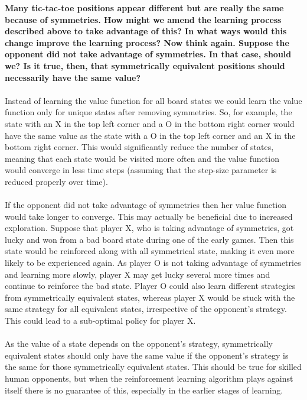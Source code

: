 \documentclass[a4paper,11pt]{article}
\numberwithin{equation}{section}
\theoremstyle{remark}
\begin{document}
\textbf{Many tic-tac-toe positions appear different but are really the same because of symmetries. How might we amend the learning process described above to take advantage of this? In what ways would this change improve the learning process? Now think again. Suppose the opponent did not take advantage of symmetries. In that case, should we? Is it true, then, that symmetrically equivalent positions should necessarily have the same value?}
\\ \\
Instead of learning the value function for all board states we could learn the value function only for unique states after removing symmetries. So, for example, the state with an X in the top left corner and a O in the bottom right corner would have the same value as the state with a O in the top left corner and an X in the bottom right corner. This would significantly reduce the number of states, meaning that each state would be visited more often and the value function would converge in less time steps (assuming that the step-size parameter is reduced properly over time).  
\\ \\
If the opponent did not take advantage of symmetries then her value function would take longer to converge. This may actually be beneficial due to increased exploration. Suppose that player X, who is taking advantage of symmetries, got lucky and won from a bad board state during one of the early games. Then this state would be reinforced along with all symmetrical state, making it even more likely to be experienced again. As player O is not taking advantage of symmetries and learning more slowly, player X may get lucky several more times and continue to reinforce the bad state. Player O could also learn different strategies from symmetrically equivalent states, whereas player X would be stuck with the same strategy for all equivalent states, irrespective of the opponent's strategy. This could lead to a sub-optimal policy for player X. 
\\ \\
As the value of a state depends on the opponent's strategy, symmetrically equivalent states should only have the same value if the opponent's strategy is the same for those symmetrically equivalent states. This should be true for skilled human opponents, but when the reinforcement learning algorithm plays against itself there is no guarantee of this, especially in the earlier stages of learning.  
 
\end{document}
